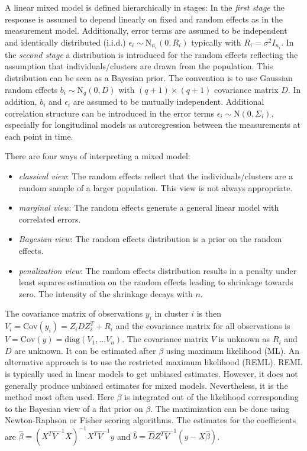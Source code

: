 \documentclass[12pt]{article}
\begin{document}
A linear mixed model is defined hierarchically in stages: 
In the \textit{first stage} the response is assumed to depend linearly on fixed and random effects as in the measurement model. Additionally, error terms are assumed to be independent and identically distributed (i.i.d.) $\epsilon_i \sim \mathrm{N}_{n_i}(0,R_i)$ typically with $R_i=\sigma^2 I_{n_i}$. 
In the \textit{second stage} a distribution is introduced for the random effects reflecting the assumption that individuals/clusters are drawn from the population.
This distribution can be seen as a Bayesian prior. The convention is to use Gaussian random effects $b_i \sim \mathrm{N}_q(0,D)$ with $(q{+}1)\times (q{+}1)$ covariance matrix $D$. In addition, $b_i$ and $\epsilon_i$ are assumed to be mutually independent. 
Additional correlation structure can be introduced in the error terms $\epsilon_i \sim \mathrm{N}(0, \Sigma_i)$, especially for longitudinal models as autoregression between the measurements at each point in time.

There are four ways of interpreting a mixed model:
\begin{itemize}
\item \textit{classical view}: The random effects reflect that the individuals/clusters are a random sample of a larger population. This view is not always appropriate.
\item \textit{marginal view}: The random effects generate a general linear
model with correlated errors.
\item \textit{Bayesian view}: The random effects distribution is a prior on the random effects.
\item \textit{penalization view}: The random effects distribution results in a penalty under least squares estimation on the random effects leading to shrinkage towards zero. The intensity of the shrinkage decays with $n$.
\end{itemize}

The covariance matrix of observations $y_i$ in cluster $i$ is then $V_i = \mathrm{Cov}(y_i) = Z_iDZ_i^T + R_i$ and the covariance matrix for all observations is $V = \mathrm{Cov}(y) = \mathrm{diag}(V_1,...V_n)$.
The covariance matrix $V$ is unknown as $R_i$ and $D$ are unknown. It can be estimated after $\beta$ using maximum likelihood (ML). An alternative approach is to use the restricted  maximum likelihood  (REML). REML is typically used in linear models to get unbiased estimates. However, it does not generally produce unbiased estimates for mixed models. Nevertheless, it is the method most often used. Here $\beta$ is integrated out of the likelihood corresponding to the Bayesian view of a flat prior on $\beta$. The maximization can be done using Newton-Raphson or Fisher scoring algorithms. The estimates for the coefficients are $\hat{\beta} = (X^T \hat{V}^{-1} X)^{-1} X^T \hat{V}^{-1}y$ and $\hat{b} = \hat{D}Z^T\hat{V}^{-1} (y-X\hat{\beta})$.
\end{document}
